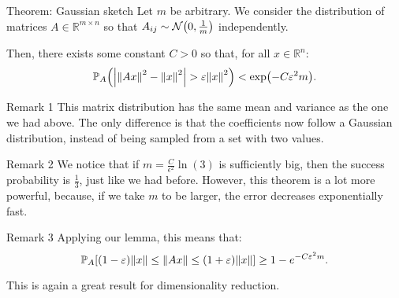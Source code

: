 \documentclass[a4paper]{article}
\begin{document}
\begin{parag}{Theorem: Gaussian sketch}
    Let $m$ be arbitrary. We consider the distribution of matrices $A \in \mathbb{R}^{m \times n}$ so that $A_{ij} \followsdistr \mathcal{N}\left(0, \frac{1}{m}\right)$ independently.

    Then, there exists some constant $C > 0$ so that, for all $x \in \mathbb{R}^n$:
    \[\prob_A\left(\left|\left\|A x\right\|^2 - \left\|x\right\|^2\right| > \epsilon \left\|x\right\|^2\right) < \exp\left(-C \epsilon^2 m\right).\]

    \begin{subparag}{Remark 1}
        This matrix distribution has the same mean and variance as the one we had above. The only difference is that the coefficients now follow a Gaussian distribution, instead of being sampled from a set with two values.
    \end{subparag}

    \begin{subparag}{Remark 2}
        We notice that if $m = \frac{C}{\epsilon^2} \ln\left(3\right)$ is sufficiently big, then the success probability is $\frac{1}{3}$, just like we had before. However, this theorem is a lot more powerful, because, if we take $m$ to be larger, the error decreases exponentially fast.
    \end{subparag}

    \begin{subparag}{Remark 3}
        Applying our lemma, this means that:
        \[\prob_A\left[\left(1 - \epsilon\right)\left\|x\right\| \leq \left\|A x\right\| \leq \left(1 + \epsilon\right) \left\|x\right\|\right] \geq 1 - e^{-C \epsilon^2 m}.\]

        This is again a great result for dimensionality reduction.
    \end{subparag}
\end{parag}
\end{document}
